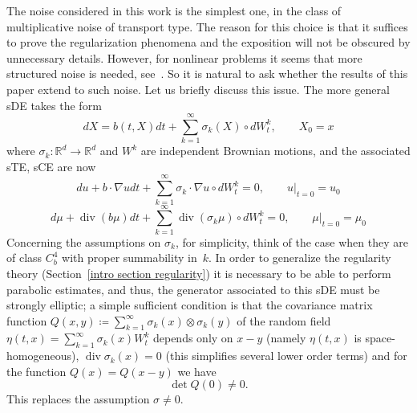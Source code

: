 \documentclass[a4paper,10pt]{article}
\newcommand\1{\mathbbm{1}}
\DeclareMathOperator{\diverg}{div}
\numberwithin{equation}{section}
\begin{document}
The noise considered in this work is the simplest one, in the class of multiplicative noise of transport type. The reason for this choice is that it suffices to prove the regularization phenomena and the exposition will not be obscured by unnecessary details. However, for nonlinear problems it seems that more structured noise is needed, see~\cite{FLAGUBPRI10a,DELFLAVIN14}. So it is natural to ask whether the results of this paper extend to such noise. Let us briefly discuss this issue. The more general sDE takes the form 
\begin{equation}
dX =b( t,X ) dt+\sum_{k=1}^{\infty }\sigma _{k}(X) \circ dW_{t}^{k},\qquad X_{0}=x  \label{SDE general}
\end{equation}
where $\sigma _{k}:\mathbb{R}^{d}\rightarrow \mathbb{R}^{d}$ and $W^{k}$ are
independent Brownian motions, and the associated sTE, sCE are now
\begin{equation}
du+b\cdot \nabla udt+\sum_{k=1}^{\infty }\sigma _{k}\cdot \nabla u\circ dW_{t}^{k}=0,\qquad u|_{t=0}=u_{0}  \label{stoch transport general}\end{equation}
\begin{equation}
d\mu +\diverg ( b \mu ) dt+\sum_{k=1}^{\infty }\diverg  
( \sigma _{k}\mu ) \circ dW_{t}^{k}=0,\qquad \mu |_{t=0}=\mu
_{0}  \label{stoch cont general}
\end{equation} 
Concerning the assumptions on $\sigma _{k}$, for simplicity, think of the case when they are of class $C_{b}^{4}$ with proper summability in~$k$. In order to generalize the regularity theory (Section~\ref{intro section regularity}) it is necessary to be able to perform parabolic estimates, and thus, the generator associated to this sDE must be strongly elliptic; a simple sufficient condition is that the covariance matrix function $Q(x,y) \coloneqq \sum_{k=1}^{\infty }\sigma _{k}( x) \otimes \sigma_{k}( y) $ of the random field $\eta ( t,x) =\sum_{k=1}^{\infty }\sigma _{k}( x) W_{t}^{k}$ depends only on $x-y$ (namely $\eta ( t,x) $ is space-homogeneous), $\diverg  \sigma _{k}( x) =0$ (this simplifies several lower order terms) and for the function $Q( x) =Q( x-y) $ we have 
\begin{equation*}
\det Q( 0) \neq 0 .
\end{equation*} 
This replaces the assumption $\sigma \neq 0$.
\end{document}
